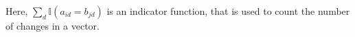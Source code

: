 \documentclass[./../../paper.tex]{subfiles}
\begin{document}
\noindent Here, $\sum_d \mathbb{I}(a_{id} = b_{jd})$ is an indicator function, that is used to count the number of changes in a vector.




\end{document}
